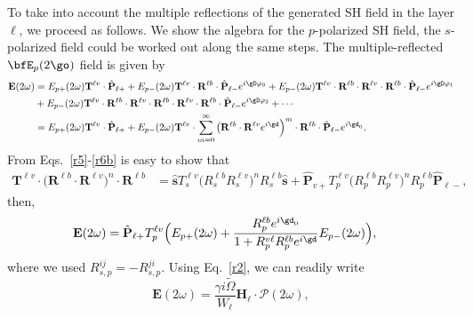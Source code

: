 To take into account the multiple reflections of the generated SH
field in the layer $\ell$, we proceed as follows. We show the algebra
for the $p$-polarized SH field, the $s$-polarized field could be
worked out along the same steps. The multiple-reflected $\bfE_p(2\go)$
field is given by
\begin{equation}\label{m7}
\begin{split}
\mathbf{E}(2\omega) 
&=  
E_{p+}(2\omega)\mathbf{T}^{\ell v}\cdot\hat{\mathbf{P}}_{\ell +}
+ E_{p-}(2\omega)\mathbf{T}^{\ell v}
\cdot\mathbf{R}^{\ell b}\cdot\hat{\mathbf{P}}_{\ell-}e^{i\gD\varphi_0}
+ E_{p-}(2\omega)\mathbf{T}^{\ell v}
\cdot\mathbf{R}^{\ell b}\cdot\mathbf{R}^{\ell v}
\cdot\mathbf{R}^{\ell b}\cdot\hat{\mathbf{P}}_{\ell-}e^{i\gD\varphi_1}
\\
&
+ E_{p-}(2\omega)\mathbf{T}^{\ell v}
\cdot\mathbf{R}^{\ell b}\cdot\mathbf{R}^{\ell v}
\cdot\mathbf{R}^{\ell b}\cdot\mathbf{R}^{\ell v}
\cdot\mathbf{R}^{\ell b}\cdot\hat{\mathbf{P}}_{\ell-}e^{i\gD\varphi_2}
+\cdots 
\\
&= 
E_{p+}(2\omega)\mathbf{T}^{\ell v}\cdot\hat{\mathbf{P}}_{\ell +}
+ E_{p-}(2\omega) \mathbf{T}^{\ell v}
\cdot\sum_{m=0}^\infty  
\big(
\mathbf{R}^{\ell b}\cdot\mathbf{R}^{\ell v} 
e^{i\gd}\Big)^m 
\cdot\mathbf{R}^{\ell b}\cdot\hat{\mathbf{P}}_{\ell-}e^{i\gd_0}
.
\end{split}
\end{equation} 
From Eqs.~\eqref{r5}-\eqref{r6b} is easy to show
that
\begin{align}\label{m1}
\mathbf{T}^{\ell v}\cdot 
\Big(\mathbf{R}^{\ell b}\cdot\mathbf{R}^{\ell v}\Big)^n 
\cdot \mathbf{R}^{\ell b}
&=
\hat{\mathbf{s}}
T^{\ell v}_s\Big(R^{\ell b}_sR^{\ell v}_s\Big)^n 
 R^{\ell b}_s 
\hat{\mathbf{s}}
+
\hat{\mathbf{P}}_{v+}
T^{\ell v}_p\Big(R^{\ell b}_pR^{\ell v}_p\Big)^n 
 R^{\ell b}_p 
\hat{\mathbf{P}}_{\ell-}
,
\end{align}
then,
\begin{equation}\label{m7}
\begin{split}
\mathbf{E}(2\omega) 
&= 
\hat{\mathbf{P}}_{\ell +}T^{\ell v}_p
\Big(
E_{p+}(2\omega) 
+
\frac{R^{\ell b}_pe^{i\gd_0}}{1+R^{v\ell}_pR^{\ell b}_pe^{i\gd}}
E_{p-}(2\omega) 
\Big)
,
\end{split}
\end{equation}
where we used $R^{ij}_{s,p}=-R^{ji}_{s,p}$.
Using Eq.~\eqref{r2}, we can readily write
\begin{equation}\label{mr8}
\mathbf{E}(2\omega) = \frac{\gamma i\tilde{\Omega}}{W_{\ell}}
\mathbf{H}_{\ell}\cdot\boldsymbol{\mathcal{P}}(2\omega),
\end{equation}
